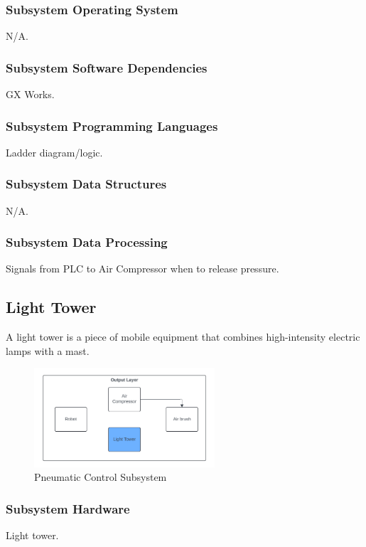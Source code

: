 \subsubsection{Subsystem Operating System}
N/A.

\subsubsection{Subsystem Software Dependencies}
GX Works.

\subsubsection{Subsystem Programming Languages}
Ladder diagram/logic.

\subsubsection{Subsystem Data Structures}
N/A.

\subsubsection{Subsystem Data Processing}
Signals from PLC to Air Compressor when to release pressure.

\subsection{Light Tower}
A light tower is a piece of mobile equipment that combines high-intensity electric lamps with a mast.

\begin{figure}[h!]
	\centering
 	\includegraphics[width=0.60\textwidth]{images/LightTower_output.png}
 \caption{Pneumatic Control Subsystem}
\end{figure}

\subsubsection{Subsystem Hardware}
Light tower.

